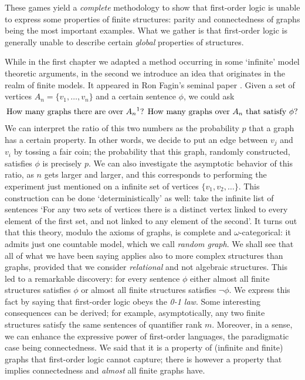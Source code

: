 These games yield a \emph{complete} methodology to show that first-order logic is unable to express some properties of finite structures: parity and connectedness of graphs being the most important examples. 
What we gather is that first-order logic is generally unable to describe certain \emph{global} properties of structures. 
 

While in the first chapter we adapted a method occurring in some `infinite' model theoretic arguments, in the second we introduce an idea that originates in the realm of finite models. 
It appeared in Ron Fagin's seminal paper \cite{fagin_prob}. 
Given a set of vertices $A_n =\{v_1, \ldots, v_n\}$ and a certain sentence $\phi$, we could ask 
\begin{align}
\label{intro_uno}
\text{How many graphs there are over $A_n$\footnotemark?
How many graphs over $A_n$ that satisfy $\phi$?}
\end{align}
We can interpret the ratio of this two numbers as the probability $p$ that a graph has a certain property. 
In other words, we decide to put an edge between $v_j$ and $v_i$ by tossing a fair coin; the probability that this graph, randomly constructed, satisfies $\phi$ is precisely $p$. 
We can also investigate the asymptotic behavior of this ratio, as $n$ gets larger and larger, and this corresponds to performing the experiment just mentioned on a infinite set of vertices $\{v_1, v_2 , \ldots\}$. 
This construction can be done `deterministically' as well: take the infinite list of sentences `For any two sets of vertices there is a distinct vertex linked to every element of the first set, and not linked to any element of the second'. 
It turns out that this theory, modulo the axioms of graphs, is complete and $\omega$-categorical: it admits just one countable model, which we call \emph{random graph}. 
We shall see that all of what we have been saying applies also to more complex structures than graphs, provided that we consider \emph{relational} and not algebraic structures.
This led to a remarkable discovery: for every sentence $\phi$ either almost all finite structures satisfies $\phi$ or almost all finite structures satisfies $\lnot \phi$. 
We express this fact by saying that first-order logic obeys the \emph{0-1 law}. Some interesting consequences can be derived; for example, asymptotically, any two finite structures satisfy the same sentences of quantifier rank $m$. 
Moreover, in a sense, we can enhance the expressive power of first-order languages, the paradigmatic case being connectedness. 
We said that it is a property of (infinite and finite) graphs that first-order logic cannot capture; there is however a property that implies connectedness and \emph{almost} all finite graphs have.


